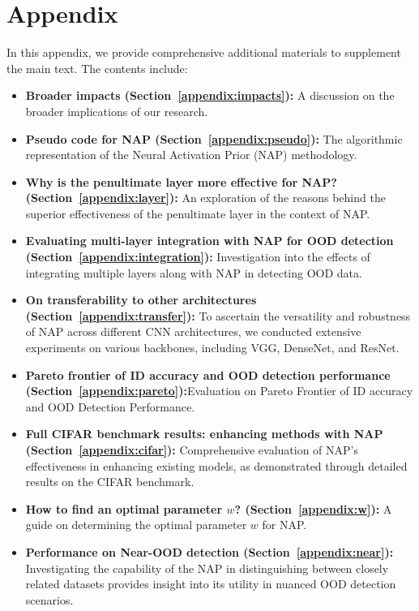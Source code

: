 \newpage
\appendix
\section*{Appendix}
In this appendix, we provide comprehensive additional materials to supplement the main text. The contents include:

\begin{itemize}
    \item \textbf{Broader impacts (Section~\ref{appendix:impacts}):} A discussion on the broader implications of our research.
    \item \textbf{Pseudo code for NAP (Section~\ref{appendix:pseudo}):} The algorithmic representation of the Neural Activation Prior (NAP) methodology.
      \item \textbf{Why is the penultimate layer more effective for NAP? (Section~\ref{appendix:layer}):} An exploration of the reasons behind the superior effectiveness of the penultimate layer in the context of NAP.
      \item \textbf{Evaluating multi-layer integration with NAP for OOD detection (Section~\ref{appendix:integration}):} Investigation into the effects of integrating multiple layers along with NAP in detecting OOD data.
      \item \textbf{On transferability to other architectures (Section~\ref{appendix:transfer}):} To ascertain the versatility and robustness of NAP across different CNN architectures, we conducted extensive experiments on various backbones, including VGG, DenseNet, and ResNet.
      \item \textbf{Pareto frontier of ID accuracy and OOD detection performance (Section~\ref{appendix:pareto}):}Evaluation on Pareto Frontier of ID accuracy and OOD Detection Performance.
      \item \textbf{Full CIFAR benchmark results: enhancing methods with NAP (Section~\ref{appendix:cifar}):} Comprehensive evaluation of NAP's effectiveness in enhancing existing models, as demonstrated through detailed results on the CIFAR benchmark.
      \item \textbf{How to find an optimal parameter $w$? (Section~\ref{appendix:w}):} A guide on determining the optimal parameter $w$ for NAP.
      \item \textbf{Performance on Near-OOD detection (Section~\ref{appendix:near}):} Investigating the capability of the NAP in distinguishing between closely related datasets provides insight into its utility in nuanced OOD detection scenarios.

\end{itemize}
